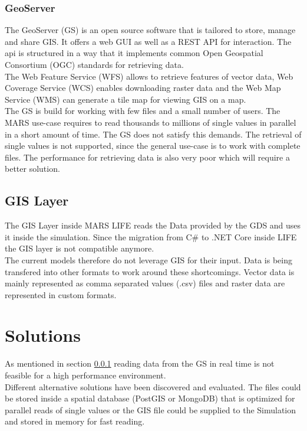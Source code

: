 \subsubsection{GeoServer} \label{sec:GS}
The GeoServer (GS) is an open source software that is tailored to store, manage and share GIS. It offers a web GUI as well as a REST API for interaction. The api is structured in a way that it implements common Open Geospatial Consortium (OGC) standards for retrieving data.\\
The Web Feature Service (WFS) allows to retrieve features of vector data, Web Coverage Service (WCS) enables downloading raster data and the Web Map Service (WMS) can generate a tile map for viewing GIS on a map.\\
The GS is build for working with few files and a small number of users. The MARS use-case requires to read thousands to millions of  single values in parallel in a short amount of time. The GS does not satisfy this demands. The retrieval of single values is not supported, since the general use-case is to work with complete files. The performance for retrieving data is also very poor which will require a better solution.


\subsection{GIS Layer}
The GIS Layer inside MARS LIFE reads the Data provided by the GDS and uses it inside the simulation. Since the migration from C\# to .NET Core inside LIFE the GIS layer is not compatible anymore.\\
The current models therefore do not leverage GIS for their input. Data is being transfered into other formats to work around these shortcomings. Vector data is mainly represented as comma separated values (.csv) files and raster data are represented in custom formats.


\section{Solutions}
As mentioned in section \ref{sec:GS} reading data from the GS in real time is not feasible for a high performance environment.\\
Different alternative solutions have been discovered and evaluated. The files could be stored inside a spatial database (PostGIS or MongoDB) that is optimized for parallel reads of single values or the GIS file could be supplied to the Simulation and stored in memory for fast reading.

